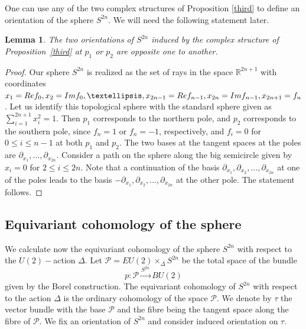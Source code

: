 \documentclass[11pt]{amsart}
\newtheorem{lemma}[theorem]{Lemma}
\theoremstyle{definition}
\theoremstyle{remark}
\numberwithin{equation}{section}
\renewcommand{\Re}{{\rm Re}}
\renewcommand{\Im}{{\rm Im}}
\begin{document}
One can use any of the two complex structures of Proposition \ref{third} to define an orientation of the sphere $S^{2n}$. We will need the following statement later.

\begin{lemma}
    \label{firstrem}
The two orientations of $S^{2n}$ induced by the complex structure of Proposition~\ref{third} at $p_1$ or $p_2$ are opposite one to another.
\end{lemma}
\begin{proof}
Our sphere $S^{2n}$ is realized as the set of rays in the space $\mathbb R^{2n+1}$ with coordinates $x_1=\Re f_0, x_2=\Im f_0, \ldots, x_{2n-1}=\Re f_{n-1}, x_{2n}=\Im f_{n-1}, x_{2n+1}=f_n$. Let us identify this topological sphere with the standard sphere given as $\sum_{i=1}^{2n+1} x_i^2=1$. Then $p_1$ corresponds to the northern pole, and $p_2$ corresponds to the southern pole, since $f_n=1$ or $f_n=-1$, respectively, and $f_i=0$ for $0\le i \le n-1$ at both $p_1$ and $p_2$. The two bases at the tangent spaces at the poles are $\partial_{x_1}, \ldots, \partial_{x_{2n}}$.  
Consider a path on the sphere along the big semicircle given by $x_i=0$ for $2\le i \le 2n$. Note that a continuation of the basis  $\partial_{x_1}, \partial_{x_2}, \ldots, \partial_{x_{2n}}$ at one of the poles leads to the basis  $-\partial_{x_1}, \partial_{x_2},\ldots, \partial_{x_{2n}}$ at the other pole. The statement follows.
\end{proof}




\subsection{Equivariant cohomology of the sphere}
\label{ECsec}

We calculate now the equivariant cohomology of the sphere $S^{2n}$ with respect to the $U(2)-$action $\Delta$. Let $\mathcal{P} = EU(2) \times_{\Delta}S^{2n}$ be the total space of the bundle 
$$
p\colon {\mathcal P} \xrightarrow{S^{2n}} BU(2)
$$ 
given by the Borel construction. The equivariant cohomology of $S^{2n}$ with respect to the action $\Delta$ is the ordinary cohomology of the space $\mathcal{P}$. We denote by $\tau$ the vector bundle with the base $\mathcal{P}$ and the fibre being the tangent space along the fibre of $\mathcal{P}$.
We fix an orientation of $S^{2n}$ and consider induced orientation on $\tau$. 
\end{document}
